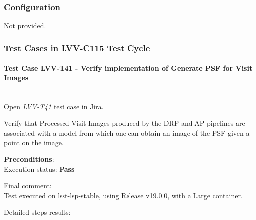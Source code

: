 \documentclass[DM,lsstdraft,STR,toc]{lsstdoc}
\begin{document}
\subsubsection{Configuration}
Not provided.

\subsubsection{Test Cases in LVV-C115 Test Cycle}

\paragraph{Test Case LVV-T41 -  Verify implementation of Generate PSF for Visit Images
 }\mbox{}\\

Open  \href{https://jira.lsstcorp.org/secure/Tests.jspa#/testCase/LVV-T41}{\textit{ LVV-T41 } }
test case in Jira.

 Verify that Processed Visit Images produced by the DRP and AP pipelines
are associated with a model from which one can obtain an image of the
PSF given a point on the image.


\textbf{ Preconditions}:\\


Execution status: {\bf Pass }

Final comment:\\ Test executed on lsst-lsp-stable, using Release v19.0.0, with a Large
container.



Detailed steps results:
\end{document}
